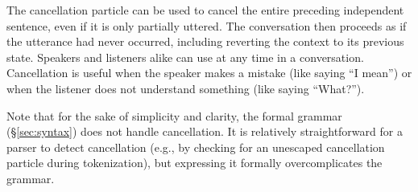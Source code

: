 The cancellation particle  can be used to cancel the entire
preceding independent sentence, even if it is only partially uttered. The
conversation then proceeds as if the utterance had never occurred, including
reverting the context to its previous state. Speakers and listeners alike can
use  at any time in a conversation. Cancellation is useful when the
speaker makes a mistake (like saying ``I mean'') or when the listener does not
understand something (like saying ``What?'').

Note that for the sake of simplicity and clarity, the formal grammar
(\S\ref{sec:syntax}) does not handle cancellation. It is relatively
straightforward for a parser to detect cancellation (e.g., by checking for an
unescaped cancellation particle during tokenization), but expressing it formally
overcomplicates the grammar.
